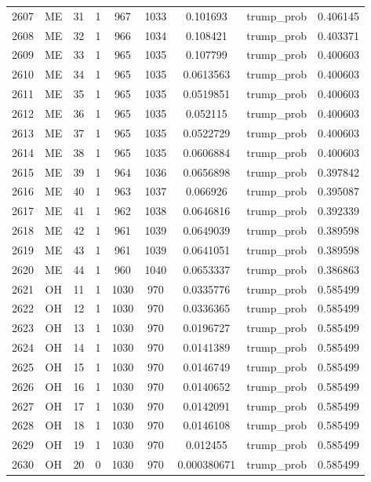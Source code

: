 \documentclass[12pt,a4paper]{article}
\begin{document}
\begin{tabular}{r|cccccccc}
	2607 & ME & 31 & 1 & 967 & 1033 & 0.101693 & trump\_prob & 0.406145 \\
	2608 & ME & 32 & 1 & 966 & 1034 & 0.108421 & trump\_prob & 0.403371 \\
	2609 & ME & 33 & 1 & 965 & 1035 & 0.107799 & trump\_prob & 0.400603 \\
	2610 & ME & 34 & 1 & 965 & 1035 & 0.0613563 & trump\_prob & 0.400603 \\
	2611 & ME & 35 & 1 & 965 & 1035 & 0.0519851 & trump\_prob & 0.400603 \\
	2612 & ME & 36 & 1 & 965 & 1035 & 0.052115 & trump\_prob & 0.400603 \\
	2613 & ME & 37 & 1 & 965 & 1035 & 0.0522729 & trump\_prob & 0.400603 \\
	2614 & ME & 38 & 1 & 965 & 1035 & 0.0606884 & trump\_prob & 0.400603 \\
	2615 & ME & 39 & 1 & 964 & 1036 & 0.0656898 & trump\_prob & 0.397842 \\
	2616 & ME & 40 & 1 & 963 & 1037 & 0.066926 & trump\_prob & 0.395087 \\
	2617 & ME & 41 & 1 & 962 & 1038 & 0.0646816 & trump\_prob & 0.392339 \\
	2618 & ME & 42 & 1 & 961 & 1039 & 0.0649039 & trump\_prob & 0.389598 \\
	2619 & ME & 43 & 1 & 961 & 1039 & 0.0641051 & trump\_prob & 0.389598 \\
	2620 & ME & 44 & 1 & 960 & 1040 & 0.0653337 & trump\_prob & 0.386863 \\
	2621 & OH & 11 & 1 & 1030 & 970 & 0.0335776 & trump\_prob & 0.585499 \\
	2622 & OH & 12 & 1 & 1030 & 970 & 0.0336365 & trump\_prob & 0.585499 \\
	2623 & OH & 13 & 1 & 1030 & 970 & 0.0196727 & trump\_prob & 0.585499 \\
	2624 & OH & 14 & 1 & 1030 & 970 & 0.0141389 & trump\_prob & 0.585499 \\
	2625 & OH & 15 & 1 & 1030 & 970 & 0.0146749 & trump\_prob & 0.585499 \\
	2626 & OH & 16 & 1 & 1030 & 970 & 0.0140652 & trump\_prob & 0.585499 \\
	2627 & OH & 17 & 1 & 1030 & 970 & 0.0142091 & trump\_prob & 0.585499 \\
	2628 & OH & 18 & 1 & 1030 & 970 & 0.0146108 & trump\_prob & 0.585499 \\
	2629 & OH & 19 & 1 & 1030 & 970 & 0.012455 & trump\_prob & 0.585499 \\
	2630 & OH & 20 & 0 & 1030 & 970 & 0.000380671 & trump\_prob & 0.585499 \\

\end{tabular}
\end{document}
